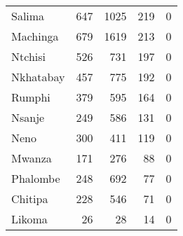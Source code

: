 \begin{tabular}{lrrrr}
Salima         &            647 &           1025 &            219 &              0 \\
Machinga       &            679 &           1619 &            213 &              0 \\
Ntchisi        &            526 &            731 &            197 &              0 \\
Nkhatabay      &            457 &            775 &            192 &              0 \\
Rumphi         &            379 &            595 &            164 &              0 \\
Nsanje         &            249 &            586 &            131 &              0 \\
Neno           &            300 &            411 &            119 &              0 \\
Mwanza         &            171 &            276 &             88 &              0 \\
Phalombe       &            248 &            692 &             77 &              0 \\
Chitipa        &            228 &            546 &             71 &              0 \\
Likoma         &             26 &             28 &             14 &              0 \\
\bottomrule
\end{tabular}
